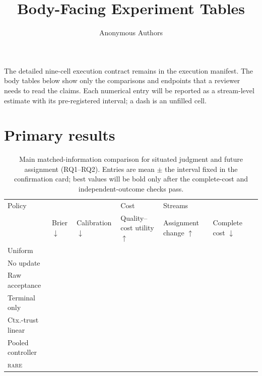 \documentclass[sigconf,anonymous]{aamas}
\title[Body-Facing Experiment Tables]{Body-Facing Experiment Tables}
\author{Anonymous Authors}
\affiliation{\institution{Internal research draft}}
\newcommand{\blank}{\textemdash}
\newcommand{\rare}{\textsc{rare}}
\newcommand{\metric}[1]{\makecell[c]{#1}}
\begin{document}
\maketitle

The detailed nine-cell execution contract remains in the execution manifest.
The body tables below show
only the comparisons and endpoints that a reviewer needs to read the claims.
Each numerical entry will be reported as a stream-level estimate with its
pre-registered interval; a dash is an unfilled cell.

\section{Primary results}

\begin{table}[t]
\centering
\small
\setlength{\tabcolsep}{4pt}
\renewcommand{\arraystretch}{1.12}
\begin{tabular}{l*{6}{>{\centering\arraybackslash}p{}}}
\toprule
Policy & \multicolumn{2}{c}{RQ1: situated signal} & \multicolumn{2}{c}{RQ2: future assignment} & Cost & Streams\\
\cmidrule(lr){2-3}\cmidrule(lr){4-5}
 & \metric{Brier\\$\downarrow$} & \metric{Calibration\\$\downarrow$} & \metric{Quality--cost\\utility\\$\uparrow$} & \metric{Assignment\\change\\$\uparrow$} & \metric{Complete\\cost\\$\downarrow$} & \\
\midrule
Uniform & \blank & \blank & \blank & \blank & \blank & \blank\\
No update & \blank & \blank & \blank & \blank & \blank & \blank\\
Raw acceptance & \blank & \blank & \blank & \blank & \blank & \blank\\
Terminal only & \blank & \blank & \blank & \blank & \blank & \blank\\
Ctx.-trust linear & \blank & \blank & \blank & \blank & \blank & \blank\\
Pooled controller & \blank & \blank & \blank & \blank & \blank & \blank\\
\rare{} & \blank & \blank & \blank & \blank & \blank & \blank\\
\bottomrule
\end{tabular}
\caption{Main matched-information comparison for situated judgment and future assignment (RQ1--RQ2). Entries are mean $\pm$ the interval fixed in the confirmation card; best values will be bold only after the complete-cost and independent-outcome checks pass.}
\label{tab:body-main-results}
\end{table}
\end{document}
